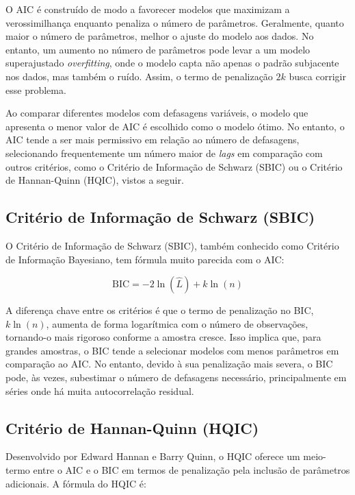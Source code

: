 \documentclass[12pt,oneside,a4paper,chapter=TITLE,english,brazil,sumario=abnt-6027-2012]{abntex2}
\begin{document}
O AIC é construído de modo a favorecer modelos que maximizam a verossimilhança enquanto penaliza o número de parâmetros. Geralmente, quanto maior o número de parâmetros, melhor o ajuste do modelo aos dados. No entanto, um aumento no número de parâmetros pode levar a um modelo superajustado \textit{overfitting}, onde o modelo capta não apenas o padrão subjacente nos dados, mas também o ruído. Assim, o termo de penalização \( 2k \) busca corrigir esse problema.

Ao comparar diferentes modelos com defasagens variáveis, o modelo que apresenta o menor valor de AIC é escolhido como o modelo ótimo. No entanto, o AIC tende a ser mais permissivo em relação ao número de defasagens, selecionando frequentemente um número maior de \textit{lags} em comparação com outros critérios, como o Critério de Informação de Schwarz (SBIC) ou o Critério de Hannan-Quinn (HQIC), vistos a seguir.

\subsection{Critério de Informação de Schwarz (SBIC)} \label{sec:bic}

O Critério de Informação de Schwarz (SBIC), também conhecido como Critério de Informação Bayesiano, tem fórmula muito parecida com o AIC:

\begin{equation}
	\text{BIC} = -2 \ln(\hat{L}) + k \ln(n)
\end{equation}

A diferença chave entre os critérios é que o termo de penalização no BIC, \( k \ln(n) \), aumenta de forma logarítmica com o número de observações, tornando-o mais rigoroso conforme a amostra cresce. Isso implica que, para grandes amostras, o BIC tende a selecionar modelos com menos parâmetros em comparação ao AIC. No entanto, devido à sua penalização mais severa, o BIC pode, às vezes, subestimar o número de defasagens necessário, principalmente em séries onde há muita autocorrelação residual.

\subsection{Critério de Hannan-Quinn (HQIC)}

Desenvolvido por Edward Hannan e Barry Quinn, o HQIC oferece um meio-termo entre o AIC e o BIC em termos de penalização pela inclusão de parâmetros adicionais. A fórmula do HQIC é:
\end{document}
